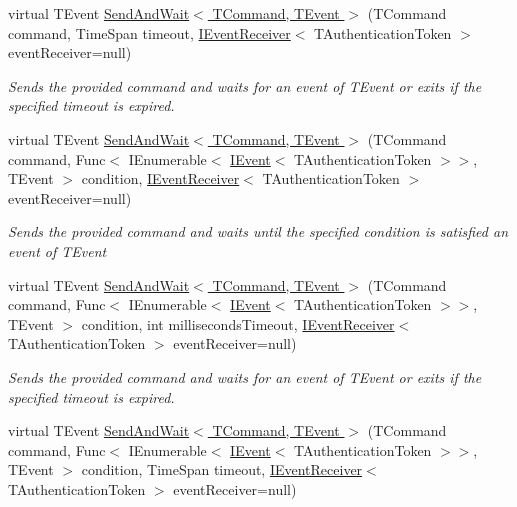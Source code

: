 \begin{DoxyCompactItemize}
virtual T\+Event \hyperlink{classCqrs_1_1Bus_1_1InProcessBus_a6d49efcd657ed029f97fac292e6296b0_a6d49efcd657ed029f97fac292e6296b0}{Send\+And\+Wait$<$ T\+Command, T\+Event $>$} (T\+Command command, Time\+Span timeout, \hyperlink{interfaceCqrs_1_1Events_1_1IEventReceiver}{I\+Event\+Receiver}$<$ T\+Authentication\+Token $>$ event\+Receiver=null)
\begin{DoxyCompactList}\small\item\em Sends the provided {\itshape command}  and waits for an event of {\itshape T\+Event}  or exits if the specified timeout is expired. \end{DoxyCompactList}\item 
virtual T\+Event \hyperlink{classCqrs_1_1Bus_1_1InProcessBus_ac8c4a77edc761f15e16c638624424443_ac8c4a77edc761f15e16c638624424443}{Send\+And\+Wait$<$ T\+Command, T\+Event $>$} (T\+Command command, Func$<$ I\+Enumerable$<$ \hyperlink{interfaceCqrs_1_1Events_1_1IEvent}{I\+Event}$<$ T\+Authentication\+Token $>$$>$, T\+Event $>$ condition, \hyperlink{interfaceCqrs_1_1Events_1_1IEventReceiver}{I\+Event\+Receiver}$<$ T\+Authentication\+Token $>$ event\+Receiver=null)
\begin{DoxyCompactList}\small\item\em Sends the provided {\itshape command}  and waits until the specified condition is satisfied an event of {\itshape T\+Event}  \end{DoxyCompactList}\item 
virtual T\+Event \hyperlink{classCqrs_1_1Bus_1_1InProcessBus_af3ed033471e85b2943a470c1a635f9c4_af3ed033471e85b2943a470c1a635f9c4}{Send\+And\+Wait$<$ T\+Command, T\+Event $>$} (T\+Command command, Func$<$ I\+Enumerable$<$ \hyperlink{interfaceCqrs_1_1Events_1_1IEvent}{I\+Event}$<$ T\+Authentication\+Token $>$$>$, T\+Event $>$ condition, int milliseconds\+Timeout, \hyperlink{interfaceCqrs_1_1Events_1_1IEventReceiver}{I\+Event\+Receiver}$<$ T\+Authentication\+Token $>$ event\+Receiver=null)
\begin{DoxyCompactList}\small\item\em Sends the provided {\itshape command}  and waits for an event of {\itshape T\+Event}  or exits if the specified timeout is expired. \end{DoxyCompactList}\item 
virtual T\+Event \hyperlink{classCqrs_1_1Bus_1_1InProcessBus_aae598cbe7ec6f4238e5a5b966df1157c_aae598cbe7ec6f4238e5a5b966df1157c}{Send\+And\+Wait$<$ T\+Command, T\+Event $>$} (T\+Command command, Func$<$ I\+Enumerable$<$ \hyperlink{interfaceCqrs_1_1Events_1_1IEvent}{I\+Event}$<$ T\+Authentication\+Token $>$$>$, T\+Event $>$ condition, Time\+Span timeout, \hyperlink{interfaceCqrs_1_1Events_1_1IEventReceiver}{I\+Event\+Receiver}$<$ T\+Authentication\+Token $>$ event\+Receiver=null)
$$
\end{DoxyCompactItemize}
